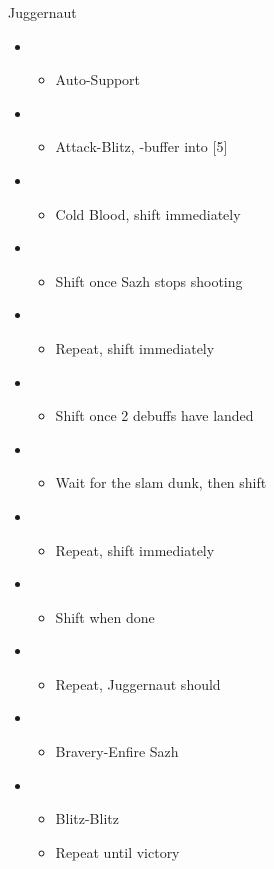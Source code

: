 \begin{battle}{Juggernaut}
	\begin{itemize}
		\item \fourth
			\begin{itemize}
				\item Auto-Support
			\end{itemize}
		\item \first
			\begin{itemize}
				\item Attack-Blitz, \rav-buffer into [5] 
			\end{itemize}
		\item \fifth
			\begin{itemize}
				\item Cold Blood, shift immediately 
			\end{itemize}
		\item \second
			\begin{itemize}
				\item Shift once Sazh stops shooting 
			\end{itemize}
		\item \fifth
			\begin{itemize}
				\item Repeat, shift immediately 
			\end{itemize}						
		\item \second
			\begin{itemize}
				\item Shift once 2 debuffs have landed 
			\end{itemize}
		\item \third
			\begin{itemize}
				\item Wait for the slam dunk, then shift
			\end{itemize}
		\item \sixth
			\begin{itemize}
				\item Repeat, shift immediately
			\end{itemize}
		\item \third
			\begin{itemize}
				\item Shift when done 
			\end{itemize}
		\item \sixth
			\begin{itemize}
				\item Repeat, Juggernaut should \stagger 
			\end{itemize}
		\item \fourth
			\begin{itemize}
				\item Bravery-Enfire Sazh
			\end{itemize}
		\item \first
			\begin{itemize}
				\item Blitz-Blitz
				\item Repeat until victory
			\end{itemize}												
	\end{itemize}
\end{battle}

